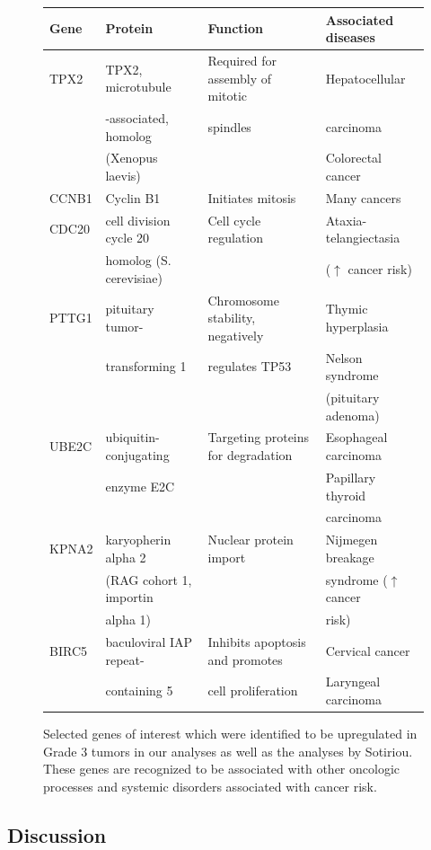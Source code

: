 \documentclass[a4paper,10pt]{article}
\begin{document}
\begin{figure}
\begin{tabular}{| l | l | l | l | }
    \hline
\textbf{Gene} & \textbf{Protein} & \textbf{Function} & \textbf{Associated diseases}\\ \hline 
TPX2 & TPX2, microtubule & Required for assembly of mitotic & Hepatocellular \\
 &  -associated, homolog  & spindles & carcinoma \\
 & (Xenopus laevis) &   &  Colorectal cancer
\\ \hline
CCNB1 & Cyclin B1 & Initiates mitosis & Many cancers\\ \hline 
CDC20 & cell division cycle 20 & Cell cycle regulation & Ataxia-telangiectasia \\
 & homolog (S. cerevisiae)  & &  ($\uparrow$ cancer risk) 
\\ \hline
PTTG1 & pituitary tumor- & Chromosome stability, negatively & Thymic hyperplasia\\
 & transforming 1 & regulates TP53 &  Nelson syndrome \\
 & & & (pituitary adenoma)
\\ \hline 
UBE2C & ubiquitin-conjugating & Targeting proteins for degradation & Esophageal carcinoma \\
 & enzyme E2C  & & Papillary thyroid \\
 & & & carcinoma
\\ \hline 
KPNA2 & karyopherin alpha 2 & Nuclear protein import & Nijmegen breakage \\
 & (RAG cohort 1, importin & & syndrome ($\uparrow$ cancer \\
 & alpha 1) &  &   risk) 
\\ \hline 
BIRC5 & baculoviral IAP repeat- &  Inhibits apoptosis and promotes & Cervical cancer \\
 & containing 5 & cell proliferation &  Laryngeal carcinoma
\\ \hline
\end{tabular}
\caption{Selected genes of interest which were identified to be upregulated in 
Grade 3 tumors in our analyses as well as the analyses by Sotiriou.  
These genes are recognized to be associated with other oncologic 
processes and systemic disorders associated with cancer risk.}\label{T3}
\end{figure}



\subsection{Discussion}
\end{document}
